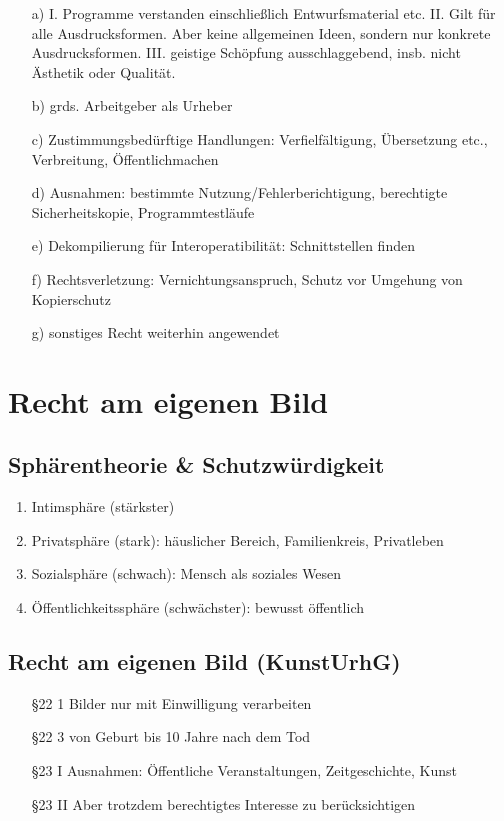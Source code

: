 \documentclass{article}
\begin{document}
\begin{itemize}
  \item[a)] I. Programme verstanden einschließlich Entwurfsmaterial etc.
        II. Gilt für alle Ausdrucksformen. Aber keine allgemeinen Ideen, sondern nur konkrete Ausdrucksformen.
        III. geistige Schöpfung ausschlaggebend, insb. nicht Ästhetik oder Qualität.
  \item[b)] grds. Arbeitgeber als Urheber
  \item[c)] Zustimmungsbedürftige Handlungen: Verfielfältigung, Übersetzung etc., Verbreitung, Öffentlichmachen
  \item[d)] Ausnahmen: bestimmte Nutzung/Fehlerberichtigung, berechtigte Sicherheitskopie, Programmtestläufe
  \item[e)] Dekompilierung für Interoperatibilität: Schnittstellen finden
  \item[f)] Rechtsverletzung: Vernichtungsanspruch, Schutz vor Umgehung von Kopierschutz
  \item[g)] sonstiges Recht weiterhin angewendet
\end{itemize}



\section{Recht am eigenen Bild}
\subsection{Sphärentheorie \& Schutzwürdigkeit}
\begin{enumerate}
  \item Intimsphäre (stärkster)
  \item Privatsphäre (stark): häuslicher Bereich, Familienkreis, Privatleben
  \item Sozialsphäre (schwach): Mensch als soziales Wesen
  \item Öffentlichkeitssphäre (schwächster): bewusst öffentlich
\end{enumerate}

\subsection{Recht am eigenen Bild (KunstUrhG)}
\begin{itemize}
  \item[§22 1] Bilder nur mit Einwilligung verarbeiten
  \item[§22 3] von Geburt bis 10 Jahre nach dem Tod
  \item[§23 I] Ausnahmen: Öffentliche Veranstaltungen, Zeitgeschichte, Kunst
  \item[§23 II] Aber trotzdem berechtigtes Interesse zu berücksichtigen
\end{itemize}
\end{document}
